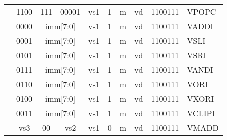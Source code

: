 \begin{table}[p]
\begin{small}
\begin{center}
\begin{tabular}{p{0in}p{0.4in}p{0.1in}p{0.3in}p{0.5in}p{0.5in}p{0.1in}p{0.3in}p{0.5in}p{0.7in}l}
&
\multicolumn{1}{|c|}{1100} &
\multicolumn{2}{c|}{111} &
\multicolumn{1}{c|}{00001} &
\multicolumn{1}{c|}{vs1} &
\multicolumn{1}{c|}{1} &
\multicolumn{1}{c|}{m} &
\multicolumn{1}{c|}{vd} &
\multicolumn{1}{c|}{1100111} & VPOPC \\
\cline{2-10}
  

&
\multicolumn{1}{|c|}{0000} &
\multicolumn{3}{c|}{imm[7:0]} &
\multicolumn{1}{c|}{vs1} &
\multicolumn{1}{c|}{1} &
\multicolumn{1}{c|}{m} &
\multicolumn{1}{c|}{vd} &
\multicolumn{1}{c|}{1100111} & VADDI \\
\cline{2-10}
  

&
\multicolumn{1}{|c|}{0001} &
\multicolumn{3}{c|}{imm[7:0]} &
\multicolumn{1}{c|}{vs1} &
\multicolumn{1}{c|}{1} &
\multicolumn{1}{c|}{m} &
\multicolumn{1}{c|}{vd} &
\multicolumn{1}{c|}{1100111} & VSLI \\
\cline{2-10}
  

&
\multicolumn{1}{|c|}{0101} &
\multicolumn{3}{c|}{imm[7:0]} &
\multicolumn{1}{c|}{vs1} &
\multicolumn{1}{c|}{1} &
\multicolumn{1}{c|}{m} &
\multicolumn{1}{c|}{vd} &
\multicolumn{1}{c|}{1100111} & VSRI \\
\cline{2-10}
  

&
\multicolumn{1}{|c|}{0111} &
\multicolumn{3}{c|}{imm[7:0]} &
\multicolumn{1}{c|}{vs1} &
\multicolumn{1}{c|}{1} &
\multicolumn{1}{c|}{m} &
\multicolumn{1}{c|}{vd} &
\multicolumn{1}{c|}{1100111} & VANDI \\
\cline{2-10}
  

&
\multicolumn{1}{|c|}{0110} &
\multicolumn{3}{c|}{imm[7:0]} &
\multicolumn{1}{c|}{vs1} &
\multicolumn{1}{c|}{1} &
\multicolumn{1}{c|}{m} &
\multicolumn{1}{c|}{vd} &
\multicolumn{1}{c|}{1100111} & VORI \\
\cline{2-10}
  

&
\multicolumn{1}{|c|}{0100} &
\multicolumn{3}{c|}{imm[7:0]} &
\multicolumn{1}{c|}{vs1} &
\multicolumn{1}{c|}{1} &
\multicolumn{1}{c|}{m} &
\multicolumn{1}{c|}{vd} &
\multicolumn{1}{c|}{1100111} & VXORI \\
\cline{2-10}
  

&
\multicolumn{1}{|c|}{0011} &
\multicolumn{3}{c|}{imm[7:0]} &
\multicolumn{1}{c|}{vs1} &
\multicolumn{1}{c|}{1} &
\multicolumn{1}{c|}{m} &
\multicolumn{1}{c|}{vd} &
\multicolumn{1}{c|}{1100111} & VCLIPI \\
\cline{2-10}
  

&
\multicolumn{2}{|c|}{vs3} &
\multicolumn{1}{c|}{00} &
\multicolumn{1}{c|}{vs2} &
\multicolumn{1}{c|}{vs1} &
\multicolumn{1}{c|}{0} &
\multicolumn{1}{c|}{m} &
\multicolumn{1}{c|}{vd} &
\multicolumn{1}{c|}{1100111} & VMADD \\
\cline{2-10}
  


\end{tabular}
\end{center}
\end{small}
\end{table}

